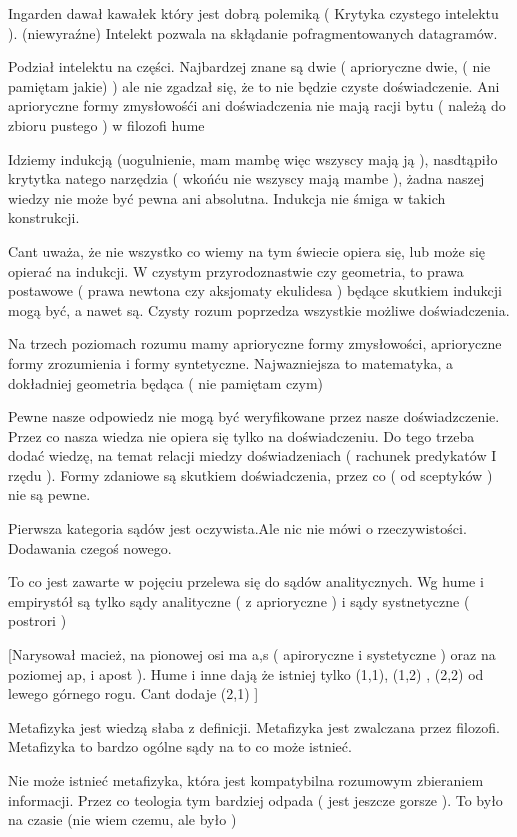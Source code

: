 \documentclass[11pt]{article}
\begin{document}
Ingarden dawał kawałek który jest dobrą polemiką ( Krytyka czystego intelektu ). (niewyraźne) Intelekt pozwala na skłądanie pofragmentowanych datagramów.

Podział intelektu na części. Najbardzej znane są dwie ( aprioryczne dwie, ( nie pamiętam jakie) ) ale nie zgadzał się, że to nie będzie czyste doświadczenie. Ani aprioryczne formy zmysłowośći ani doświadczenia nie mają racji bytu ( należą do zbioru pustego ) w filozofi hume

Idziemy indukcją (uogulnienie, mam mambę więc wszyscy mają ją ), nasdtąpiło krytytka natego narzędzia ( wkońću nie wszyscy mają mambe ), żadna naszej wiedzy nie może być pewna ani absolutna. Indukcja nie śmiga w takich konstrukcji.

Cant uważa, że nie wszystko co wiemy na tym świecie opiera się, lub może się opierać na indukcji.
W czystym przyrodoznastwie czy geometria, to prawa postawowe ( prawa newtona czy aksjomaty ekulidesa ) będące skutkiem indukcji mogą być, a nawet są.
Czysty rozum poprzedza wszystkie możliwe doświadczenia.

Na trzech poziomach rozumu mamy aprioryczne formy zmysłowości, aprioryczne formy zrozumienia i formy syntetyczne. Najwazniejsza to matematyka, a dokładniej geometria będąca ( nie pamiętam czym)

Pewne nasze odpowiedz nie mogą być weryfikowane przez nasze doświadzczenie. Przez co nasza wiedza nie opiera się tylko na doświadczeniu. Do tego trzeba dodać wiedzę, na temat relacji miedzy doświadzeniach ( rachunek predykatów I rzędu ). Formy zdaniowe są skutkiem doświadczenia, przez co ( od sceptyków ) nie są pewne.

Pierwsza kategoria sądów jest oczywista.Ale nic nie mówi o rzeczywistości. Dodawania czegoś nowego.

To co jest zawarte w pojęciu przelewa się do sądów analitycznych. Wg hume i empirystół są tylko sądy analityczne ( z aprioryczne ) i sądy systnetyczne ( postrori )

[Narysował macież, na pionowej osi ma a,s ( apiroryczne i systetyczne ) oraz na poziomej ap, i apost ). Hume i inne dają że istniej tylko (1,1), (1,2) , (2,2) od lewego górnego rogu. Cant dodaje (2,1) ]

Metafizyka jest wiedzą słaba z definicji. Metafizyka jest zwalczana przez filozofi. Metafizyka to bardzo ogólne sądy na to co może istnieć.

Nie może istnieć metafizyka, która jest kompatybilna rozumowym zbieraniem informacji. Przez co teologia tym bardziej odpada ( jest jeszcze gorsze ).  To było na czasie (nie wiem czemu, ale było )
\end{document}
